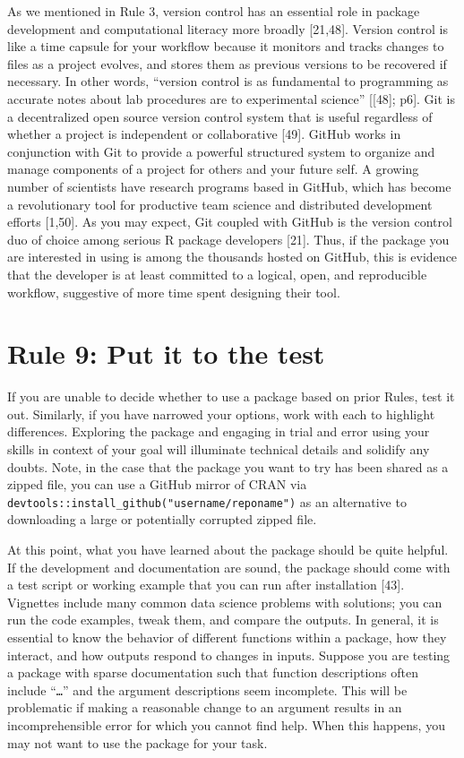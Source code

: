 \documentclass[10pt,letterpaper]{article}
\begin{document}
As we mentioned in Rule 3, version control has an essential role in
package development and computational literacy more broadly {[}21,48{]}.
Version control is like a time capsule for your workflow because it
monitors and tracks changes to files as a project evolves, and stores
them as previous versions to be recovered if necessary. In other words,
``version control is as fundamental to programming as accurate notes
about lab procedures are to experimental science'' {[}{[}48{]}; p6{]}.
Git is a decentralized open source version control system that is useful
regardless of whether a project is independent or collaborative
{[}49{]}. GitHub works in conjunction with Git to provide a powerful
structured system to organize and manage components of a project for
others and your future self. A growing number of scientists have
research programs based in GitHub, which has become a revolutionary tool
for productive team science and distributed development efforts
{[}1,50{]}. As you may expect, Git coupled with GitHub is the version
control duo of choice among serious R package developers {[}21{]}. Thus,
if the package you are interested in using is among the thousands hosted
on GitHub, this is evidence that the developer is at least committed to
a logical, open, and reproducible workflow, suggestive of more time
spent designing their tool.

\hypertarget{rule-9-put-it-to-the-test}{%
\section{Rule 9: Put it to the test}\label{rule-9-put-it-to-the-test}}

If you are unable to decide whether to use a package based on prior
Rules, test it out. Similarly, if you have narrowed your options, work
with each to highlight differences. Exploring the package and engaging
in trial and error using your skills in context of your goal will
illuminate technical details and solidify any doubts. Note, in the case
that the package you want to try has been shared as a zipped file, you
can use a GitHub mirror of CRAN via
\texttt{devtools::install\_github("username/reponame")} as an
alternative to downloading a large or potentially corrupted zipped file.

At this point, what you have learned about the package should be quite
helpful. If the development and documentation are sound, the package
should come with a test script or working example that you can run after
installation {[}43{]}. Vignettes include many common data science
problems with solutions; you can run the code examples, tweak them, and
compare the outputs. In general, it is essential to know the behavior of
different functions within a package, how they interact, and how outputs
respond to changes in inputs. Suppose you are testing a package with
sparse documentation such that function descriptions often include
``\texttt{\ldots{}}'' and the argument descriptions seem incomplete.
This will be problematic if making a reasonable change to an argument
results in an incomprehensible error for which you cannot find help.
When this happens, you may not want to use the package for your task.
\end{document}
